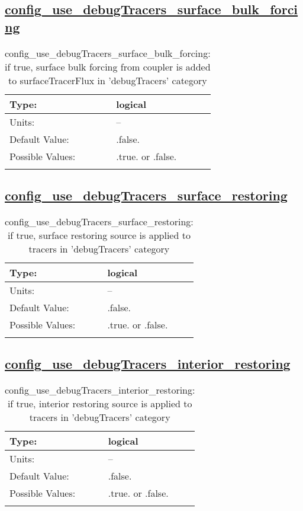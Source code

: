 \subsection[config\_use\_debugTracers\_surface\_bulk\_forcing]{\hyperref[sec:nm_tab_tracer_forcing_debugTracers]{config\_use\_debugTracers\_surface\_bulk\_forcing}}
\label{subsec:nm_sec_config_use_debugTracers_surface_bulk_forcing}
\begin{center}
\begin{longtable}{| p{2.0in} || p{4.0in} |}
    \hline
    Type: & logical \\
    \hline
    Units: & -- \\
    \hline
    Default Value: & .false. \\
    \hline
    Possible Values: & .true. or .false. \\
    \hline
    \caption{config\_use\_debugTracers\_surface\_bulk\_forcing: if true, surface bulk forcing from coupler is added to surfaceTracerFlux in 'debugTracers' category}
\end{longtable}
\end{center}
\subsection[config\_use\_debugTracers\_surface\_restoring]{\hyperref[sec:nm_tab_tracer_forcing_debugTracers]{config\_use\_debugTracers\_surface\_restoring}}
\label{subsec:nm_sec_config_use_debugTracers_surface_restoring}
\begin{center}
\begin{longtable}{| p{2.0in} || p{4.0in} |}
    \hline
    Type: & logical \\
    \hline
    Units: & -- \\
    \hline
    Default Value: & .false. \\
    \hline
    Possible Values: & .true. or .false. \\
    \hline
    \caption{config\_use\_debugTracers\_surface\_restoring: if true, surface restoring source is applied to tracers in 'debugTracers' category}
\end{longtable}
\end{center}
\subsection[config\_use\_debugTracers\_interior\_restoring]{\hyperref[sec:nm_tab_tracer_forcing_debugTracers]{config\_use\_debugTracers\_interior\_restoring}}
\label{subsec:nm_sec_config_use_debugTracers_interior_restoring}
\begin{center}
\begin{longtable}{| p{2.0in} || p{4.0in} |}
    \hline
    Type: & logical \\
    \hline
    Units: & -- \\
    \hline
    Default Value: & .false. \\
    \hline
    Possible Values: & .true. or .false. \\
    \hline
    \caption{config\_use\_debugTracers\_interior\_restoring: if true, interior restoring source is applied to tracers in 'debugTracers' category}
\end{longtable}
\end{center}
